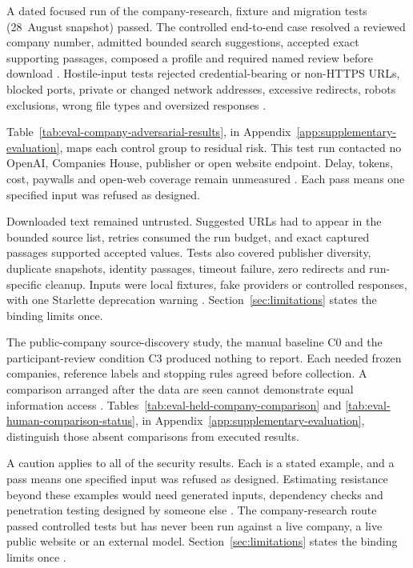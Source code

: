 A dated focused run of the company-research, fixture and migration tests (28~August snapshot)
passed. The controlled end-to-end case
resolved a reviewed company number, admitted bounded search suggestions, accepted exact supporting
passages, composed a profile and required named review before download
\citep{gao2023alce,nist2023airmf}. Hostile-input tests rejected credential-bearing or non-HTTPS URLs,
blocked ports, private or changed network addresses, excessive redirects, robots exclusions, wrong
file types and oversized responses \citep{greshake2023indirect,autio2024genai}.

Table~\ref{tab:eval-company-adversarial-results}, in Appendix~\ref{app:supplementary-evaluation},
maps each control group to residual risk. This test run contacted no OpenAI, Companies House,
publisher or open website endpoint. Delay, tokens, cost, paywalls and open-web coverage remain
unmeasured \citep{openai2026websearch,pineau2021reproducibility}. Each pass means one specified input
was refused as designed.

Downloaded text remained untrusted. Suggested URLs had to appear in the bounded source list, retries
consumed the run budget, and exact captured passages supported accepted values. Tests also covered
publisher diversity, duplicate snapshots, identity passages, timeout failure, zero redirects and
run-specific cleanup. Inputs were local fixtures, fake providers or controlled responses, with one
Starlette deprecation warning \citep{greshake2023indirect,nist2023airmf}.
Section~\ref{sec:limitations} states the binding limits once.

The public-company source-discovery study, the manual baseline C0 and the participant-review
condition C3 produced nothing to report. Each needed frozen companies, reference labels and stopping
rules agreed before collection. A comparison arranged after the data are seen cannot demonstrate
equal information access \citep{kapoor2023leakage,pineau2021reproducibility,bucinca2021forcing}.
Tables~\ref{tab:eval-held-company-comparison} and \ref{tab:eval-human-comparison-status}, in
Appendix~\ref{app:supplementary-evaluation}, distinguish those absent comparisons from executed
results.

A caution applies to all of the security results. Each is a stated example, and a pass means one
specified input was refused as designed. Estimating resistance beyond these examples would need
generated inputs, dependency checks and penetration testing designed by someone else
\citep{greshake2023indirect,nist2023airmf}. The company-research route passed controlled tests but
has never been run against a live company, a live public website or an external model.
Section~\ref{sec:limitations} states the binding limits once
\citep{openai2026websearch,pineau2021reproducibility}.

